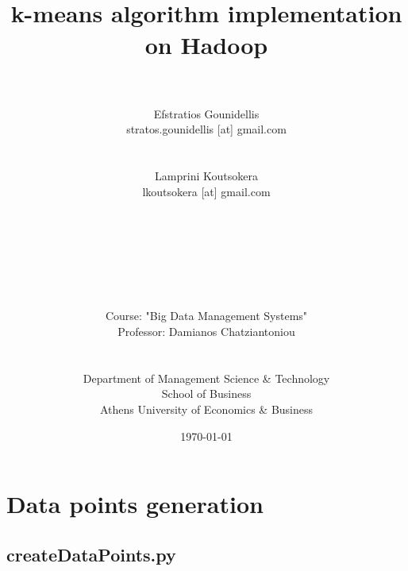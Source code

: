 \documentclass[11pt]{article}
\title{
    \horrule{0.5pt} \\ [0.4cm]
    \huge  k-means algorithm implementation on Hadoop\\
    \horrule{2pt} \\[0.5cm]	
\vspace{10px}
}
\author{\large Efstratios Gounidellis\\stratos.gounidellis [at] gmail.com \\ \\ \\ 
		Lamprini Koutsokera\\lkoutsokera [at] gmail.com \\ \\ \\ \\ \\ \\ \\ \\
Course: "Big Data Management Systems"
\\
Professor: Damianos Chatziantoniou
\\ \\ \\
\vspace{40px}
Department of Management Science \& Technology
\\ School of Business
\\
Athens University of Economics \& Business} %
\date{
\vfill \large\today} %
\begin{document}
    
\maketitle

\pagebreak 

\tableofcontents

\pagebreak 
    
\section{Data points generation}\label{data-points-generation}

\subsection{createDataPoints.py}\label{createdatapoints.py}
\end{document}

